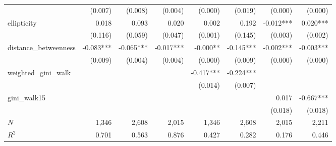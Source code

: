 \begin{tabular}{lrrrrrrr}
                      &                      (0.007) &                    (0.008) &                      (0.004) &                      (0.000) &                    (0.019) &                              (0.000) &                              (0.000) \\ 
ellipticity           &                        0.018 &                      0.093 &                        0.020 &                        0.002 &                      0.192 &                            -0.012*** &                             0.020*** \\ 
                      &                      (0.116) &                    (0.059) &                      (0.047) &                      (0.001) &                    (0.145) &                              (0.003) &                              (0.002) \\ 
distance\_betweenness &                    -0.083*** &                  -0.065*** &                    -0.017*** &                     -0.000** &                  -0.145*** &                            -0.002*** &                            -0.003*** \\ 
                      &                      (0.009) &                    (0.004) &                      (0.004) &                      (0.000) &                    (0.009) &                              (0.000) &                              (0.000) \\ 
weighted\_gini\_walk  &                              &                            &                              &                    -0.417*** &                  -0.224*** &                                      &                                      \\ 
                      &                              &                            &                              &                      (0.014) &                    (0.007) &                                      &                                      \\ 
gini\_walk15          &                              &                            &                              &                              &                            &                                0.017 &                            -0.667*** \\ 
                      &                              &                            &                              &                              &                            &                              (0.018) &                              (0.018) \\ 
\midrule
$N$                   &                        1,346 &                      2,608 &                        2,015 &                        1,346 &                      2,608 &                                2,015 &                                2,211 \\ 
$R^2$                 &                        0.701 &                      0.563 &                        0.876 &                        0.427 &                      0.282 &                                0.176 &                                0.446 \\ 
\bottomrule
\end{tabular}
